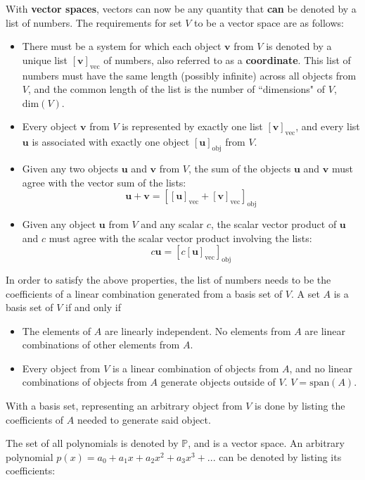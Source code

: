 \documentclass{article}
\begin{document}
With {\bf vector spaces}, vectors can now be any quantity that {\bf can} be denoted by a list of numbers. The requirements for set \(V\) to be a vector space are as follows:
\begin{itemize}
\item There must be a system for which each object \(\mathbf{v}\) from \(V\) is denoted by a unique list \([\mathbf{v}]_{\text{vec}}\) of numbers, also referred to as a {\bf coordinate}. This list of numbers must have the same length (possibly infinite) across all objects from \(V\), and the common length of the list is the number of ``dimensions" of \(V\), \(\text{dim}(V)\). 
\item Every object \(\mathbf{v}\) from \(V\) is represented by exactly one list \([\mathbf{v}]_{\text{vec}}\), and every list \(\mathbf{u}\) is associated with exactly one object \([\mathbf{u}]_{\text{obj}}\) from \(V\). 
\item Given any two objects \(\mathbf{u}\) and \(\mathbf{v}\) from \(V\), the sum of the objects \(\mathbf{u}\) and \(\mathbf{v}\) must agree with the vector sum of the lists:
\[\mathbf{u} + \mathbf{v} = [[\mathbf{u}]_{\text{vec}} + [\mathbf{v}]_{\text{vec}}]_{\text{obj}}\]
\item Given any object \(\mathbf{u}\) from \(V\) and any scalar \(c\), the scalar vector product of \(\mathbf{u}\) and \(c\) must agree with the scalar vector product involving the lists:
\[c\mathbf{u} = [c[\mathbf{u}]_{\text{vec}}]_{\text{obj}}\] 
\end{itemize}
In order to satisfy the above properties, the list of numbers needs to be the coefficients of a linear combination generated from a basis set of \(V\). A set \(A\) is a basis set of \(V\) if and only if 
\begin{itemize}
\item The elements of \(A\) are linearly independent. No elements from \(A\) are linear combinations of other elements from \(A\). 
\item Every object from \(V\) is a linear combination of objects from \(A\), and no linear combinations of objects from \(A\) generate objects outside of \(V\). \(V = \text{span}(A)\).
\end{itemize}
With a basis set, representing an arbitrary object from \(V\) is done by listing the coefficients of \(A\) needed to generate said object.


\vspace{5mm}

The set of all polynomials is denoted by \(\mathbb{P}\), and is a vector space. An arbitrary polynomial \(p(x) = a_0 + a_1 x + a_2 x^2 + a_3 x^3 + ...\) can be denoted by listing its coefficients:   
\end{document}
